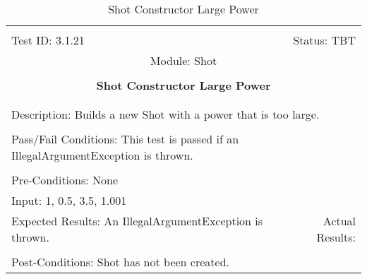 \documentclass[titlepage]{article}
\begin{document}
\begin{center}%
\begin{table}
\begin{tabular}{|l r|}\hline&\\[-2mm]
	Test ID: 3.1.21	&Status: TBT\\[-3mm]
	\multicolumn{2}{|c|}{Module: Shot}\\&\\
	\multicolumn{2}{|c|}{\textbf{\large{Shot Constructor Large Power}}}\\&\\\hline&\\[-3mm]
	\multicolumn{2}{|p{\textwidth}|}{Description: Builds a new Shot with a power that is too large.}\\[1mm]\hline&\\[-3mm]
	\multicolumn{2}{|p{\textwidth}|}{Pass/Fail Conditions: This test is passed if an IllegalArgumentException is thrown.}\\[1mm]\hline&\\[-3mm]
	\multicolumn{2}{|p{\textwidth}|}{Pre-Conditions: None}\\[4mm]
	\multicolumn{2}{|p{\textwidth}|}{Input: 1, 0.5, 3.5, 1.001}\\[2mm]\hline
	\multicolumn{1}{|p{0.49\textwidth}}{Expected Results: An IllegalArgumentException is thrown.}	&\multicolumn{1}{|p{0.45\textwidth}|}{Actual Results: }\\\hline&\\[-3mm]
	\multicolumn{2}{|p{\textwidth}|}{Post-Conditions: Shot has not been created.}\\\hline
\end{tabular}
\caption{Shot Constructor Large Power}
\end{table}
\end{center}
\end{document}
